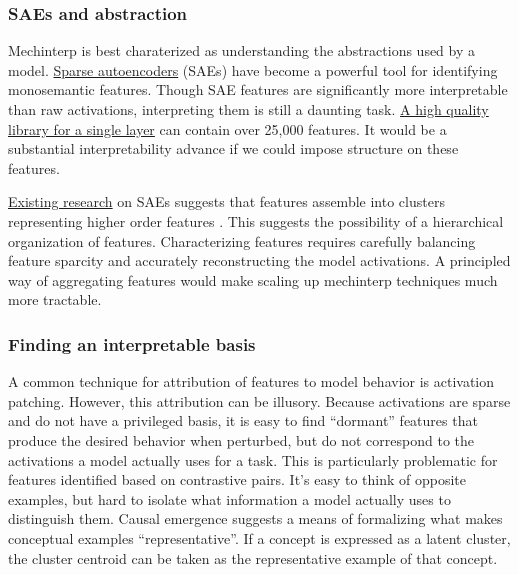 \subsubsection{SAEs and abstraction}
Mechinterp is best charaterized as understanding the abstractions used by a model.
\hyperlink{}{Sparse autoencoders} (SAEs) have become a powerful tool for identifying monosemantic features.
Though SAE features are significantly more interpretable than raw activations, interpreting them is still a daunting task.
\hyperlink{https://www.lesswrong.com/posts/f9EgfLSurAiqRJySD/open-source-sparse-autoencoders-for-all-residual-stream}{A high quality library for a single layer}
can contain over 25,000 features.
It would be a substantial interpretability advance if we could impose structure on these features.

\hyperlink{https://transformer-circuits.pub/2023/monosemantic-features/index.html#phenomenology-feature-splitting}{Existing research} 
on SAEs suggests that features assemble into clusters representing higher order features
\cite{bricken2023monosemanticity}.
This suggests the possibility of a hierarchical organization of features.
Characterizing features requires carefully balancing feature sparcity and accurately reconstructing the model activations.
A principled way of aggregating features would make scaling up mechinterp techniques much more tractable.

\subsubsection{Finding an interpretable basis}
A common technique for attribution of features to model behavior is activation patching.
However, this attribution can be illusory\cite{makelov2023subspace}.
Because activations are sparse and do not have a privileged basis,
it is easy to find ``dormant'' features that produce the desired behavior when perturbed,
but do not correspond to the activations a model actually uses for a task.
This is particularly problematic for features identified based on contrastive pairs.
It's easy to think of opposite examples, but hard to isolate what information a model actually
uses to distinguish them.
Causal emergence suggests a means of formalizing what makes conceptual examples ``representative''.
If a concept is expressed as a latent cluster, the cluster centroid can be taken as the
representative example of that concept.

